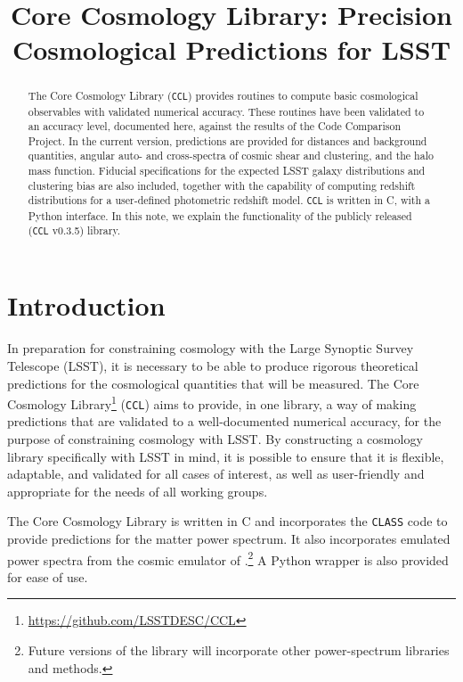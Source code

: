 \documentclass[\docopts]{\docclass}
\newcommand{\ccl}{{\tt CCL}\xspace}
\begin{document}
\title{Core Cosmology Library: Precision Cosmological Predictions for LSST}

\maketitlepre

\begin{abstract}

The Core Cosmology Library (\ccl) provides routines to compute basic cosmological observables with validated numerical accuracy. These routines have been validated to an accuracy level, documented here, against the results of the Code Comparison Project. In the current version, predictions are provided for distances and background quantities, angular auto- and cross-spectra of cosmic shear and clustering, and the halo mass function. Fiducial specifications for the expected LSST galaxy distributions and clustering bias are also included, together with the capability of computing redshift distributions for a user-defined photometric redshift model. \ccl is written in C, with a Python interface. In this note, we explain the functionality of the publicly released (\ccl v0.3.5) library.

\end{abstract}


\maketitlepost

\newpage
\tableofcontents{}
\newpage

\section{Introduction}
\label{sec:intro}

In preparation for constraining cosmology with the Large Synoptic Survey Telescope (LSST), it is necessary to be able to produce rigorous theoretical predictions for the cosmological quantities that will be measured. The Core Cosmology Library\footnote{\url{https://github.com/LSSTDESC/CCL}} (\ccl) aims to provide, in one library, a way of making predictions that are validated to a well-documented numerical accuracy, for the purpose of constraining cosmology with LSST. By constructing a cosmology library specifically with LSST in mind, it is possible to ensure that it is flexible, adaptable, and validated for all cases of interest, as well as user-friendly and appropriate for the needs of all working groups.

The Core Cosmology Library is written in C and incorporates the {\tt CLASS} code \citep{class} to provide predictions for the matter power spectrum. It also incorporates emulated power spectra from the cosmic emulator of \citet{Lawrence17}.\footnote{Future versions of the library will incorporate other power-spectrum libraries and methods.} A Python wrapper is also provided for ease of use.
\end{document}
